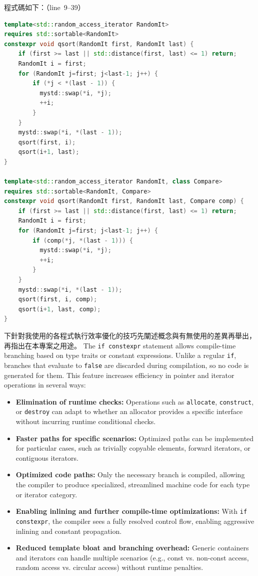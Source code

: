 \documentclass[a4paper,12pt]{article}
\begin{document}
程式碼如下：（line~9--39）
\begin{lstlisting}[language=C++]
template<std::random_access_iterator RandomIt>
requires std::sortable<RandomIt>
constexpr void qsort(RandomIt first, RandomIt last) {
    if (first >= last || std::distance(first, last) <= 1) return;
    RandomIt i = first;
    for (RandomIt j=first; j<last-1; j++) {
        if (*j < *(last - 1)) {
          mystd::swap(*i, *j);
          ++i;
        }
    }
    mystd::swap(*i, *(last - 1));
    qsort(first, i);
    qsort(i+1, last);
}

template<std::random_access_iterator RandomIt, class Compare>
requires std::sortable<RandomIt, Compare>
constexpr void qsort(RandomIt first, RandomIt last, Compare comp) {
    if (first >= last || std::distance(first, last) <= 1) return;
    RandomIt i = first;
    for (RandomIt j=first; j<last-1; j++) {
        if (comp(*j, *(last - 1))) {
          mystd::swap(*i, *j);
          ++i;
        }
    }
    mystd::swap(*i, *(last - 1));
    qsort(first, i, comp);
    qsort(i+1, last, comp);
}
\end{lstlisting}
\label{2-D-1-2}
下針對我使用的各程式執⾏效率優化的技巧先闡述概念與有無使用的差異再舉出，再指出在本專案之用途。
\label{branching}
The \texttt{if constexpr} statement allows compile-time branching based on type traits or constant expressions. Unlike a regular \texttt{if}, branches that evaluate to \texttt{false} are discarded during compilation, so no code is generated for them. This feature increases efficiency in pointer and iterator operations in several ways:

\begin{itemize}
  \item \textbf{Elimination of runtime checks:} Operations such as \texttt{allocate}, \texttt{construct}, or \texttt{destroy} can adapt to whether an allocator provides a specific interface without incurring runtime conditional checks.
  \item \textbf{Faster paths for specific scenarios:} Optimized paths can be implemented for particular cases, such as trivially copyable elements, forward iterators, or contiguous iterators.
  \item \textbf{Optimized code paths:} Only the necessary branch is compiled, allowing the compiler to produce specialized, streamlined machine code for each type or iterator category.
  \item \textbf{Enabling inlining and further compile-time optimizations:} With \texttt{if constexpr}, the compiler sees a fully resolved control flow, enabling aggressive inlining and constant propagation.
  \item \textbf{Reduced template bloat and branching overhead:} Generic containers and iterators can handle multiple scenarios (e.g., const vs. non-const access, random access vs. circular access) without runtime penalties.
\end{itemize}
\end{document}

